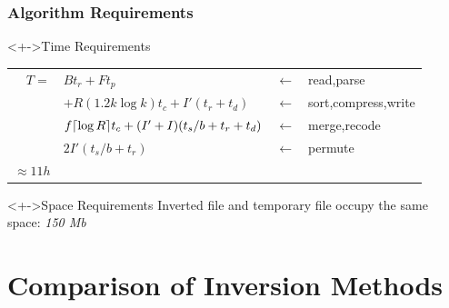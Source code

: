 \documentclass[svgnames]{beamer}
\begin{document}
\begin{frame}
    \frametitle{Algorithm Requirements}
    
    \begin{exampleblock}<+->{Time Requirements}    
        \small
        \begin{tabular}{rlcl}
            $T =$ & $Bt_r + Ft_p$ & $\leftarrow$ & read,parse \\
            & $+R(1.2k\log k)t_c + I'(t_r + t_d)$ & $\leftarrow$ & sort,compress,write \\
            & $f\lceil \log R \rceil t_c + (I'+I)(t_s/b + t_r + t_d)$ & $\leftarrow$ & merge,recode \\
            & $2I'(t_s/b + t_r)$ & $\leftarrow$ & permute \\
            \emph{$\approx 11h$}
        \end{tabular}
    \end{exampleblock}


    \begin{exampleblock}<+->{Space Requirements}
        \small
        Inverted file and temporary file occupy the same space: \emph{150 Mb}
    \end{exampleblock}

\end{frame}


\section{Comparison of Inversion Methods}
\end{document}
